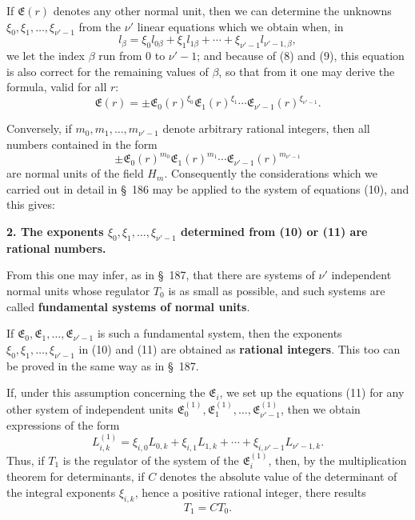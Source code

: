 \documentclass[11pt]{article}
\begin{document}
If $\mathfrak E(r)$ denotes any other normal unit, then we can determine the unknowns $\xi_0,\xi_1,\ldots,\xi_{\nu'-1}$ from the $\nu'$ linear equations which we obtain when, in
\begin{equation}
l_\beta=\xi_0l_{0\beta}+\xi_1l_{1\beta}+\cdots+\xi_{\nu'-1}l_{\nu'-1,\beta},
\tag{11}
\end{equation}
we let the index $\beta$ run from $0$ to $\nu'-1$; and because of (8) and (9), this equation is also correct for the remaining values of $\beta$, so that from it one may derive the formula, valid for all $r$:
\begin{equation}
\mathfrak E(r)=\pm\mathfrak E_0(r)^{\xi_0}\mathfrak E_1(r)^{\xi_1}\cdots\mathfrak E_{\nu'-1}(r)^{\xi_{\nu'-1}}.
\tag{12}
\end{equation}

Conversely, if $m_0,m_1,\ldots,m_{\nu'-1}$ denote arbitrary rational integers, then all numbers contained in the form
\[
\pm\mathfrak E_0(r)^{m_0}\mathfrak E_1(r)^{m_1}\cdots\mathfrak E_{\nu'-1}(r)^{m_{\nu'-1}}
\]
are normal units of the field $H_m$. Consequently the considerations which we carried out in detail in \S~186 may be applied to the system of equations (10), and this gives:

\begin{center}\textbf{2. The exponents $\xi_0,\xi_1,\ldots,\xi_{\nu'-1}$ determined from (10) or (11) are rational numbers.}\end{center}

From this one may infer, as in \S~187, that there are systems of $\nu'$ independent normal units whose regulator $T_0$ is as small as possible, and such systems are called \textbf{fundamental systems of normal units}.

If $\mathfrak E_0,\mathfrak E_1,\ldots,\mathfrak E_{\nu'-1}$ is such a fundamental system, then the exponents $\xi_0,\xi_1,\ldots,\xi_{\nu'-1}$ in (10) and (11) are obtained as \textbf{rational integers}. This too can be proved in the same way as in \S~187.

If, under this assumption concerning the $\mathfrak E_i$, we set up the equations (11) for any other system of independent units $\mathfrak E_0^{(1)},\mathfrak E_1^{(1)},\ldots,\mathfrak E_{\nu'-1}^{(1)}$, then we obtain expressions of the form
\[
L_{i,k}^{(1)}=\xi_{i,0}L_{0,k}+\xi_{i,1}L_{1,k}+\cdots+\xi_{i,\nu'-1}L_{\nu'-1,k}.
\]
Thus, if $T_1$ is the regulator of the system of the $\mathfrak E_i^{(1)}$, then, by the multiplication theorem for determinants, if $C$ denotes the absolute value of the determinant of the integral exponents $\xi_{i,k}$, hence a positive rational integer, there results
\begin{equation}
T_1=CT_0.
\tag{13}
\end{equation}
\end{document}
